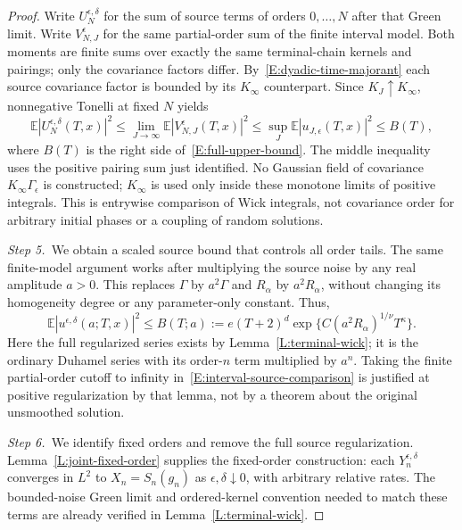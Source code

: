\documentclass[12pt,oneside,openany]{book}
\numberwithin{equation}{section}
\theoremstyle{nogostyle}
\theoremstyle{definition}
\newcommand{\E}{\mathbb{E}}
\begin{document}
\begin{proof}
  Write $U_N^{\epsilon,\delta}$ for the sum of source terms of orders
  $0,\ldots,N$ after that Green limit. Write $V_{N,J}^\epsilon$ for the same
  partial-order sum of the finite interval model. Both moments are finite sums
  over exactly the same terminal-chain kernels and pairings; only the covariance
  factors differ. By~\eqref{E:dyadic-time-majorant} each source covariance
  factor is bounded by its $K_\infty$ counterpart. Since $K_J\uparrow K_\infty$,
  nonnegative Tonelli at fixed $N$ yields
  \begin{equation}\label{E:interval-source-comparison}
    \E|U_N^{\epsilon,\delta}(T,x)|^2
    \le\lim_{J\to\infty}\E|V_{N,J}^\epsilon(T,x)|^2
    \le\sup_J\E|u_{J,\epsilon}(T,x)|^2\le B(T),
  \end{equation}
  where $B(T)$ is the right side of~\eqref{E:full-upper-bound}. The middle
  inequality uses the positive pairing sum just identified. No Gaussian field of
  covariance $K_\infty\Gamma_\epsilon$ is constructed; $K_\infty$ is used only
  inside these monotone limits of positive integrals. This is entrywise
  comparison of Wick integrals, not covariance order for arbitrary initial
  phases or a coupling of random solutions.



  \medskip
  \noindent\textit{Step 5.~}We obtain a scaled source bound that controls all
  order tails.
  The same finite-model argument works after multiplying the source noise by any
  real amplitude $a > 0$. This replaces $\Gamma$ by $a^2\Gamma$ and $R_\alpha$
  by $a^2R_\alpha$, without changing its homogeneity degree or any
  parameter-only constant. Thus,
  \begin{equation}\label{E:regularized-scaled-moment}
    \E|u^{\epsilon,\delta}(a;T,x)|^2
    \le B(T;a):=e(T+2)^d
    \exp\{C(a^2R_\alpha)^{1/\nu}T^\kappa\}.
  \end{equation}
  Here the full regularized series exists by Lemma~\ref{L:terminal-wick}; it is
  the ordinary Duhamel series with its order-$n$ term multiplied by $a^n$.
  Taking the finite partial-order cutoff to infinity
  in~\eqref{E:interval-source-comparison} is justified at positive
  regularization by that lemma, not by a theorem about the original unsmoothed
  solution.


  \medskip
  \noindent\textit{Step 6.~}We identify fixed orders and remove the full
  source regularization.
  Lemma~\ref{L:joint-fixed-order} supplies the fixed-order construction: each
  $Y_n^{\epsilon,\delta}$ converges in $L^2$ to $X_n = S_n(g_n)$ as
  $\epsilon,\delta\downarrow0$, with arbitrary relative rates. The bounded-noise
  Green limit and ordered-kernel convention needed to match these terms are
  already verified in Lemma~\ref{L:terminal-wick}.


\end{proof}
\end{document}
